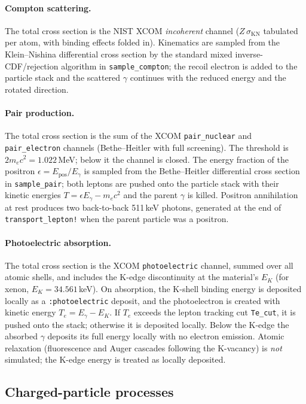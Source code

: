 \documentclass[11pt]{article}
\begin{document}
\paragraph{Compton scattering.}
The total cross section is the NIST XCOM \emph{incoherent} channel
($Z\,\sigma_{\mathrm{KN}}$ tabulated per atom, with binding effects folded in).
Kinematics are sampled from the Klein--Nishina differential cross section by
the standard mixed inverse-CDF/rejection algorithm in
\texttt{sample\_compton}; the recoil electron is added to the particle stack
and the scattered $\gamma$ continues with the reduced energy and the rotated
direction.

\paragraph{Pair production.}
The total cross section is the sum of the XCOM \texttt{pair\_nuclear} and
\texttt{pair\_electron} channels (Bethe--Heitler with full screening).
The threshold is $2 m_e c^2 = 1.022$\,MeV; below it the channel is closed.
The energy fraction of the positron $\epsilon = E_{\mathrm{pos}}/E_\gamma$ is
sampled from the Bethe--Heitler differential cross section in
\texttt{sample\_pair}; both leptons are pushed onto the particle stack with
their kinetic energies $T = \epsilon E_\gamma - m_e c^2$ and the parent $\gamma$
is killed. Positron annihilation at rest produces two back-to-back 511\,keV
photons, generated at the end of \texttt{transport\_lepton!} when the parent
particle was a positron.

\paragraph{Photoelectric absorption.}
The total cross section is the XCOM \texttt{photoelectric} channel, summed
over all atomic shells, and includes the K-edge discontinuity at the
material's $E_K$ (for xenon, $E_K = 34.561$\,keV). On absorption, the K-shell
binding energy is deposited locally as a \texttt{:photoelectric} deposit, and
the photoelectron is created with kinetic energy $T_e = E_\gamma - E_K$. If
$T_e$ exceeds the lepton tracking cut \texttt{Te\_cut}, it is pushed onto the
stack; otherwise it is deposited locally. Below the K-edge the absorbed
$\gamma$ deposits its full energy locally with no electron emission. Atomic
relaxation (fluorescence and Auger cascades following the K-vacancy) is
\emph{not} simulated; the K-edge energy is treated as locally deposited.

\subsection{Charged-particle processes}
\label{sec:physics-leptons}
\end{document}
